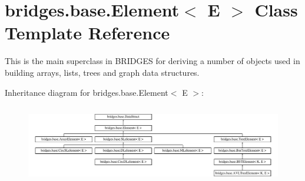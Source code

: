 \hypertarget{classbridges_1_1base_1_1_element}{}\section{bridges.\+base.\+Element$<$ E $>$ Class Template Reference}
\label{classbridges_1_1base_1_1_element}


This is the main superclass in B\+R\+I\+D\+G\+E\+S for deriving a number of objects used in building arrays, lists, trees and graph data structures.  


Inheritance diagram for bridges.\+base.\+Element$<$ E $>$\+:\begin{figure}[H]
\begin{center}
\leavevmode
\includegraphics[height=3.485477cm]{classbridges_1_1base_1_1_element}
\end{center}
\end{figure}
